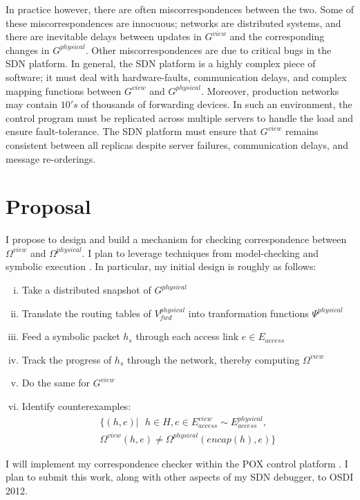 \documentclass{sig-alternate-10pt}
\begin{document}
In practice however, there are often miscorrespondences between the two. Some
of these miscorrespondences are innocuous; networks are distributed systems,
and there are inevitable delays between updates in $G^{view}$ and the
corresponding changes in $G^{physical}$. Other miscorrespondences are
due to critical bugs in the SDN platform. In general, the SDN platform is a
highly complex piece of software; it must deal with hardware-faults,
communication delays, and complex mapping functions  between $G^{view}$ and
$G^{physical}$. Moreover, production networks may contain  $10's$ of thousands of
forwarding devices. In such an environment, the control program must be
replicated across multiple servers to handle the load and ensure
fault-tolerance. The SDN platform must ensure that $G^{view}$ remains consistent
between all replicas despite server failures, communication delays, and
message re-orderings.

\section{Proposal}

I propose to design and build a mechanism for checking 
correspondence between $\Omega^{view}$ and $\Omega^{physical}$.
I plan to leverage techniques from model-checking and symbolic execution \cite{symbolicmodel}.
In particular, my initial design is roughly as follows:
\begin{enumerate}[i.]
\item Take a distributed snapshot of $G^{physical}$ \cite{distributedsnapshots}
\item Translate the routing tables of $V_{fwd}^{physical}$ into tranformation
functions $\Psi^{physical}$
\item Feed a symbolic packet $h_s$ through each access link $e \in E_{access}$
\item Track the progress of $h_s$ through the network, thereby computing
$\Omega^{view}$
\item Do the same for $G^{view}$
\item Identify counterexamples:
\begin{align*}
 \{ (h,e) |\text{ } h \in H, e \in E^{view}_{access} \sim
 E^{physical}_{access}, \\
 \Omega^{view}(h,e) \neq  \Omega^{physical}(encap(h),e) \}
\end{align*}
\end{enumerate}

I will implement my correspondence checker within the POX control platform
\cite{POX}.
I plan to submit this work, along with other aspects of my SDN debugger, to
OSDI 2012.

\scriptsize



%
\end{document}
